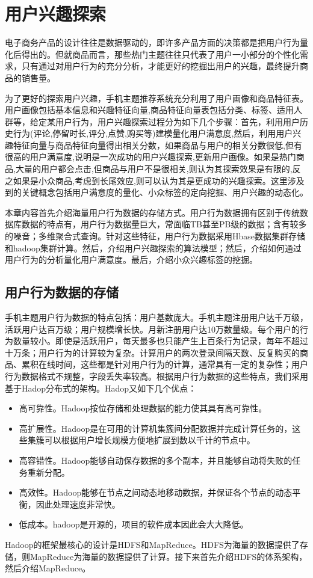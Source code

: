 ﻿
\chapter{用户兴趣探索}
\label{chap:interestExplore}
电子商务产品的设计往往是数据驱动的，即许多产品方面的决策都是把用户行为量化后得出的。但就商品而言，那些热门主题往往只代表了用户一小部分的个性化需求，只有通过对用户行为的充分分析，才能更好的挖掘出用户的兴趣，最终提升商品的销售量。

为了更好的探索用户兴趣，手机主题推荐系统充分利用了用户画像和商品特征表。用户画像包括基本信息和兴趣特征向量,商品特征向量表包括分类、标签、适用人群等，给定某用户行为，用户兴趣探索过程分为如下几个步骤：首先，利用用户历史行为(评论,停留时长,评分,点赞,购买等)建模量化用户满意度,然后，利用用户兴趣特征向量与商品特征向量得出相关分数，如果商品与用户的相关分数很低,但有很高的用户满意度,说明是一次成功的用户兴趣探索,更新用户画像。如果是热门商品,大量的用户都会点击,但商品与用户不是很相关,则认为其探索效果是有限的,反之如果是小众商品,考虑到长尾效应,则可以认为其是更成功的兴趣探索。这里涉及到的关键概念包括用户满意度的量化、小众标签的定向挖掘、用户兴趣的动态化。

本章内容首先介绍海量用户行为数据的存储方式。用户行为数据拥有区别于传统数据库数据的特点有，用户行为数据量巨大，常面临TB甚至PB级的数据；含有较多的噪音；多维聚合式查询。针对这些特征，用户行为数据采用Hbase数据集群存储和hadoop集群计算。然后，介绍用户兴趣探索的算法模型；然后，介绍如何通过用户行为的分析量化用户满意度。最后，介绍小众兴趣标签的挖掘。

\section{用户行为数据的存储}
手机主题用户行为数据的特点包括：用户基数庞大。手机主题注册用户达千万级，活跃用户达百万级；用户规模增长快。月新注册用户达10万数量级。每个用户的行为数量较小。即使是活跃用户，每天最多也只能产生上百条行为记录，每年不超过十万条；用户行为的计算较为复杂。计算用户的两次登录间隔天数、反复购买的商品、累积在线时间，这些都是针对用户行为的计算，通常具有一定的复杂性；用户行为数据格式不规整，字段丢失率较高。根据用户行为数据的这些特点，我们采用基于Hadop分布式的架构。Hadop又如下几个优点：
\begin{itemize}
\item 高可靠性。Hadoop按位存储和处理数据的能力使其具有高可靠性。
\item 高扩展性。Hadoop是在可用的计算机集簇间分配数据并完成计算任务的，这些集簇可以根据用户增长规模方便地扩展到数以千计的节点中。
\item 高容错性。Hadoop能够自动保存数据的多个副本，并且能够自动将失败的任务重新分配。
\item 高效性。Hadoop能够在节点之间动态地移动数据，并保证各个节点的动态平衡，因此处理速度非常快。
\item 低成本。hadoop是开源的，项目的软件成本因此会大大降低。
\end{itemize}
Hadoop的框架最核心的设计是HDFS和MapReduce。HDFS为海量的数据提供了存储，则MapReduce为海量的数据提供了计算。接下来首先介绍HDFS的体系架构，然后介绍MapReduce。
